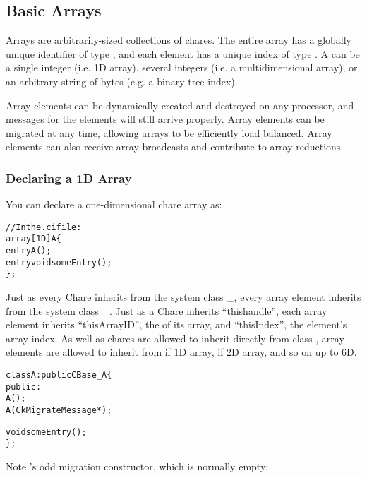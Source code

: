\subsection{Basic Arrays}
\label{basic arrays}

Arrays  are arbitrarily-sized collections of chares.  The
entire array has a globally unique identifier of type , and
each element has a unique index of type .  A 
can be a single integer (i.e. 1D array), several integers (i.e. a
multidimensional array), or an arbitrary string of bytes (e.g. a binary tree
index).

Array elements can be dynamically created and destroyed on any processor,
and messages for the elements will still arrive properly.
Array elements can be migrated at any time, allowing arrays to be efficiently
load balanced.  Array elements can also receive array broadcasts and
contribute to array reductions.

\subsubsection{Declaring a 1D Array}

You can declare a one-dimensional chare array
as:

\begin{alltt}
//In the .ci file:
array [1D] A \{
  entry A();
  entry void someEntry();
\};
\end{alltt}

Just as every Chare inherits from the system class \_, every 
array element inherits from the system class \_.
Just as a Chare inherits ``thishandle'', each
array element inherits ``thisArrayID'', the  of its array,
and ``thisIndex'', the element's array index.
As well as chares are allowed to inherit directly from class ,
array elements are allowed to inherit from  if 1D array,
 if 2D array, and so on up to 6D.

\begin{alltt}
class A : public CBase\_A \{
  public:
    A();
    A(CkMigrateMessage *);

    void someEntry();
\};
\end{alltt}

Note 's odd migration constructor, which is normally empty:

